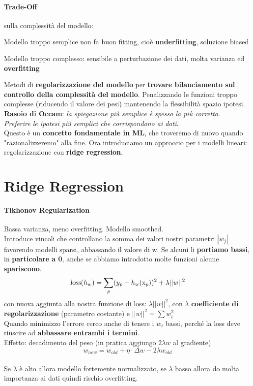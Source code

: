 \documentclass[10pt]{book}
\begin{document}
\paragraph{Trade-Off} sulla complessità del modello:
\begin{list}{}{}
	\item Modello troppo semplice non fa buon fitting, cioè \textbf{underfitting}, soluzione biased
	\item Modello troppo complesso: sensibile a perturbazione dei dati, molta varianza ed \textbf{overfitting}
\end{list}
Metodi di \textbf{regolarizzazione del modello} per \textbf{trovare bilanciamento sul controllo della complessità del modello}. Penalizzando le funzioni troppo complesse (riducendo il valore dei pesi) mantenendo la flessibilità spazio ipotesi.\\
\textbf{Rasoio di Occam}: \textit{la spiegazione più semplice è spesso la più corretta}.\\\textit{Preferire le ipotesi più semplici che corrispondono ai dati}.\\
Questo è un \textbf{concetto fondamentale in ML}, che troveremo di nuovo quando "razionalizzeremo" alla fine. Ora introduciamo un approccio per i modelli lineari: regolarizzazione con \textbf{ridge regression}.
\pagebreak
\section{Ridge Regression}
\paragraph{Tikhonov Regularization} Bassa varianza, meno overfitting. Modello smoothed.\\
Introduce vincoli che controllano la somma dei valori nostri parametri $|w_j|$ favorendo modelli sparsi, abbassando il valore di w. Se alcuni li \textbf{portiamo bassi}, in \textbf{particolare a 0}, anche se abbiamo introdotto molte funzioni alcune \textbf{spariscono}.
$$\textsl{loss}(h_w) = \sum_p (y_p + h_\text{w}(\text{x}_p))^2 + \lambda ||w||^2 $$ con nuova aggiunta alla nostra funzione di loss: $\lambda ||w||^2$, con $\lambda$ \textbf{coefficiente di regolarizzazione} (parametro costante) e $||w||^2 = \sum w_i^2$\\
Quando minimizzo l'errore cerco anche di tenere i $w_i$ bassi, perché la loss deve riuscire ad \textbf{abbassare entrambi i termini}.\\
Effetto: decadimento del peso (in pratica aggiungo $2\lambda w$ al gradiente)
$$w_{new} = w_{old} + \eta\cdot\Delta w - 2\lambda w_{old}$$\\
Se $\lambda$ è alto allora modello fortemente normalizzato, se $\lambda$ basso allora do molta importanza ai dati quindi rischio overfitting.
\end{document}
